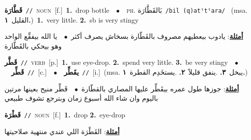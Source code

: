 \documentclass[10pt,a4paper,twoside]{article} %
\begin{document}
\begin{multicols}{2}
{\setlength\topsep{0pt}\textbf{\foreignlanguage{arabic}{قَطَّارَة}}\ {\color{gray}\texttt{//}\color{black}}\ \textsc{noun}\ [f.]\ \textbf{1.}~drop bottle\ \ $\bullet$\ \ \textsc{ph.} \color{gray} \foreignlanguage{arabic}{بَالقَطَّارَة}\color{black}\ {\color{gray}\texttt{/{\sffamily bil (q)atˤtˤara}/}\color{black}}\ \color{gray} (msa. \foreignlanguage{arabic}{القليل}~\foreignlanguage{arabic}{\textbf{١.}})\color{black}\ \textbf{1.}~very little.  \textbf{2.}~sb is very stingy\  \begin{flushright}\color{gray}\foreignlanguage{arabic}{\textbf{\underline{\foreignlanguage{arabic}{أمثلة}}}: يادوب بيعطيهم مصروف بالقَطّارة بسخاش يصرف أكثر\ $\bullet$\ \  يا الله بيفقِّع الواحد وهو بيحكي بالقَطّارة}\end{flushright}\color{black}} \vspace{2mm}

{\setlength\topsep{0pt}\textbf{\foreignlanguage{arabic}{قَطَّر}}\ {\color{gray}\texttt{//}\color{black}}\ \textsc{verb}\ [p.]\ \textbf{1.}~use eye-drop.  \textbf{2.}~spend very little.  \textbf{3.}~be very stingy\ \ $\bullet$\ \ \setlength\topsep{0pt}\textbf{\foreignlanguage{arabic}{قَطِّر}}\ {\color{gray}\texttt{//}\color{black}}\ [c.]\ \ $\bullet$\ \ \setlength\topsep{0pt}\textbf{\foreignlanguage{arabic}{يقَطِّر}}\ {\color{gray}\texttt{//}\color{black}}\ [i.]\ \color{gray}(msa. \foreignlanguage{arabic}{يبخل}~\foreignlanguage{arabic}{\textbf{٣.}}  .\foreignlanguage{arabic}{ينفق قليلاََ}~\foreignlanguage{arabic}{\textbf{٢.}}  .\foreignlanguage{arabic}{يستخَدِم القطرة}~\foreignlanguage{arabic}{\textbf{١.}})\color{black}\  \begin{flushright}\color{gray}\foreignlanguage{arabic}{\textbf{\underline{\foreignlanguage{arabic}{أمثلة}}}: جوزها طول عمره بيقَطِّر عليها المصاري بالقطّارة\ $\bullet$\ \  قَطِّر منيح بعينها مرتين باليوم وان شاء الله أسبوع زمان وبترجع تشوف طبيعي}\end{flushright}\color{black}} \vspace{2mm}

{\setlength\topsep{0pt}\textbf{\foreignlanguage{arabic}{قَطْرَة}}\ {\color{gray}\texttt{//}\color{black}}\ \textsc{noun}\ [f.]\ \textbf{1.}~drop  \textbf{2.}~eye-drop\  \begin{flushright}\color{gray}\foreignlanguage{arabic}{\textbf{\underline{\foreignlanguage{arabic}{أمثلة}}}: القَطْرَة اللي عندي منتهية صلاحيتها}\end{flushright}\color{black}} \vspace{2mm}


\end{multicols}
\end{document}
